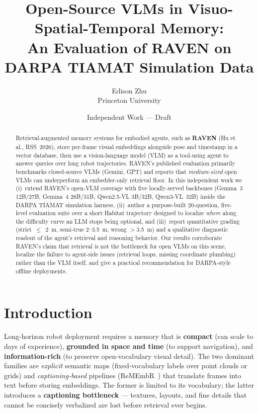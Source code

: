 \documentclass[11pt]{article}
\title{\bfseries Open-Source VLMs in Visuo-Spatial-Temporal Memory:\\
An Evaluation of RAVEN on DARPA TIAMAT Simulation Data}
\author{Edison Zhu\\ \small Princeton University}
\date{Independent Work --- Draft}
\begin{document}
\maketitle

\begin{abstract}
Retrieval-augmented memory systems for embodied agents, such as \textbf{RAVEN} (Hu et al., RSS~2026), store per-frame visual embeddings alongside pose and timestamp in a vector database, then use a vision-language model (VLM) as a tool-using agent to answer queries over long robot trajectories. RAVEN's published evaluation primarily benchmarks closed-source VLMs (Gemini, GPT) and reports that \emph{medium-sized} open VLMs can underperform an embedder-only retrieval floor. In this independent work we (i)~extend RAVEN's open-VLM coverage with five locally-served backbones (Gemma~3 12B/27B, Gemma~4 26B/31B, Qwen2.5-VL 3B/32B, Qwen3-VL~32B) inside the DARPA TIAMAT simulation harness, (ii)~author a purpose-built 20-question, five-level evaluation suite over a short Habitat trajectory designed to localize \emph{where} along the difficulty curve an LLM stops being optional, and (iii)~report quantitative grading (strict~$\leq$~2~m, semi-true 2--3.5~m, wrong $>$3.5~m) and a qualitative diagnostic readout of the agent's retrieval and reasoning behavior. Our results corroborate RAVEN's claim that retrieval is not the bottleneck for open VLMs on this scene, localize the failure to agent-side issues (retrieval loops, missing coordinate plumbing) rather than the VLM itself, and give a practical recommendation for DARPA-style offline deployments.
\end{abstract}

\section{Introduction}

Long-horizon robot deployment requires a memory that is \textbf{compact} (can scale to days of experience), \textbf{grounded in space and time} (to support navigation), and \textbf{information-rich} (to preserve open-vocabulary visual detail). The two dominant families are \emph{explicit} semantic maps (fixed-vocabulary labels over point clouds or grids) and \emph{captioning-based} pipelines (ReMEmbR~\cite{anwar2024remembr}) that translate frames into text before storing embeddings. The former is limited to its vocabulary; the latter introduces a \textbf{captioning bottleneck} --- textures, layouts, and fine details that cannot be concisely verbalized are lost before retrieval ever begins.
\end{document}
